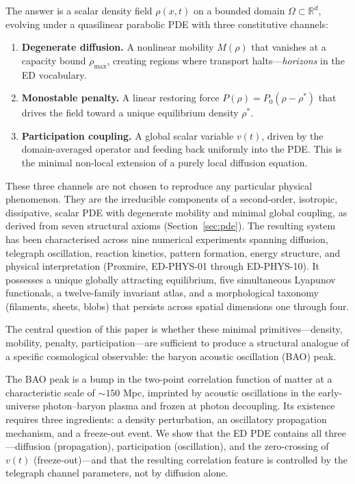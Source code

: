 \documentclass[11pt]{article}
\begin{document}
The answer is a scalar density field \(\rho(x,t)\) on a bounded domain \(\Omega \subset \mathbb{R}^d\), evolving under a quasilinear parabolic PDE with three constitutive channels:

\begin{enumerate}
  \item \textbf{Degenerate diffusion.} A nonlinear mobility \(M(\rho)\) that vanishes at a capacity bound \(\rho_{\max}\), creating regions where transport halts---\emph{horizons} in the ED vocabulary.

  \item \textbf{Monostable penalty.} A linear restoring force \(P(\rho) = P_0(\rho - \rho^*)\) that drives the field toward a unique equilibrium density \(\rho^*\).

  \item \textbf{Participation coupling.} A global scalar variable \(v(t)\), driven by the domain-averaged operator and feeding back uniformly into the PDE. This is the minimal non-local extension of a purely local diffusion equation.
\end{enumerate}

These three channels are not chosen to reproduce any particular physical phenomenon. They are the irreducible components of a second-order, isotropic, dissipative, scalar PDE with degenerate mobility and minimal global coupling, as derived from seven structural axioms (Section~\ref{sec:pde}). The resulting system has been characterised across nine numerical experiments spanning diffusion, telegraph oscillation, reaction kinetics, pattern formation, energy structure, and physical interpretation (Proxmire, ED-PHYS-01 through ED-PHYS-10). It possesses a unique globally attracting equilibrium, five simultaneous Lyapunov functionals, a twelve-family invariant atlas, and a morphological taxonomy (filaments, sheets, blobs) that persists across spatial dimensions one through four.

The central question of this paper is whether these minimal primitives---density, mobility, penalty, participation---are sufficient to produce a structural analogue of a specific cosmological observable: the baryon acoustic oscillation (BAO) peak.

The BAO peak is a bump in the two-point correlation function of matter at a characteristic scale of \(\sim 150\) Mpc, imprinted by acoustic oscillations in the early-universe photon--baryon plasma and frozen at photon decoupling. Its existence requires three ingredients: a density perturbation, an oscillatory propagation mechanism, and a freeze-out event. We show that the ED PDE contains all three---diffusion (propagation), participation (oscillation), and the zero-crossing of \(v(t)\) (freeze-out)---and that the resulting correlation feature is controlled by the telegraph channel parameters, not by diffusion alone.
\end{document}
